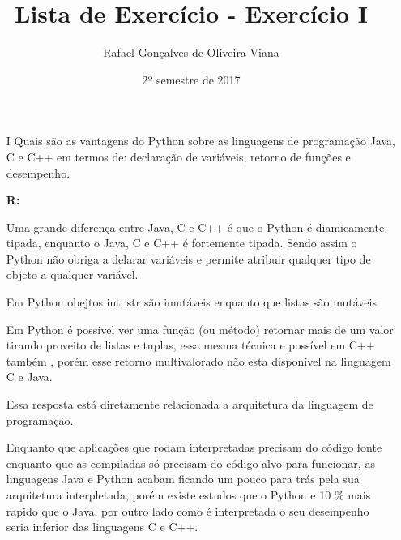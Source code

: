 \documentclass[12pt]{article}
\title{Lista de Exercício  - Exercício I }
\author{Rafael Gonçalves de  Oliveira Viana}
\date{2º semestre de 2017}
\begin{document}
\maketitle

\begin{enumerate}
\item[I]
Quais são as vantagens do Python sobre as linguagens de programação Java, C e C++
em termos de: declaração de variáveis, retorno de funções e desempenho.

\textbf{R:}
	
	
	 Uma grande diferença entre Java, C e C++ é que o Python é diamicamente tipada, enquanto o Java, C e C++ é fortemente tipada. Sendo assim o Python não obriga a delarar variáveis e permite atribuir qualquer tipo de objeto a qualquer variável.
	 
	 Em Python obejtos int, str são imutáveis enquanto que listas são mutáveis
	 
		 
	Em Python é possível ver uma função (ou método) retornar mais de um valor tirando proveito de listas e tuplas, essa mesma técnica e possível em C++ também , porém esse retorno multivalorado não esta disponível na linguagem C e Java.
	 
	 Essa resposta está diretamente relacionada a arquitetura da linguagem de programação.
	 
	 Enquanto que aplicações que rodam interpretadas precisam do código fonte enquanto que as compiladas só precisam do código alvo para funcionar, as linguagens Java e Python acabam ficando um pouco para trás pela sua arquitetura interpletada, porém existe estudos que o Python e 10 \% mais rapido que o Java, por outro lado como é interpretada o seu desempenho seria inferior das linguagens C e C++.
	 

\end{enumerate}
\end{document}
